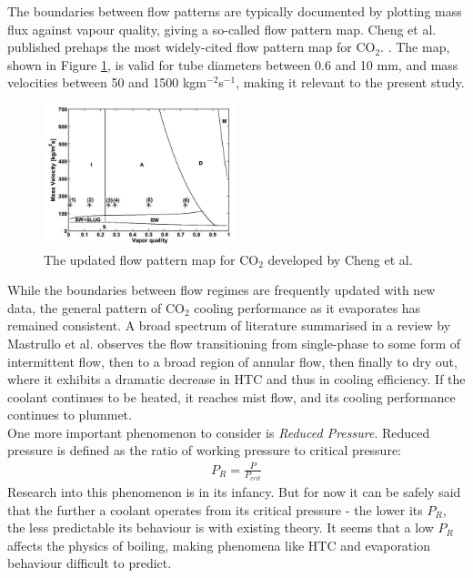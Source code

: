 \documentclass{report}
\begin{document}
The boundaries between flow patterns are typically documented by plotting mass flux against vapour quality, giving a so-called flow pattern map. Cheng et al. published prehaps the most widely-cited flow pattern map for CO$_2$. \cite{Cheng 2008}. The map, shown in Figure \ref{fig:chengMap}, is valid for tube diameters between 0.6 and 10 mm, and mass velocities between 50 and 1500 kgm$^{-2}$s$^{-1}$, making it relevant to the present study.\\
\begin{figure}
\includegraphics[width=0.5\textwidth]{chengMap}
\caption{The updated flow pattern map for CO$_2$ developed by Cheng et al. \cite{Cheng 2008}}
\label{fig:chengMap}
\end{figure}
While the boundaries between flow regimes are frequently updated with new data, the general pattern of CO$_2$ cooling performance as it evaporates has remained consistent. A broad spectrum of literature summarised in a review by Mastrullo et al. \cite{Mastrullo 2010} observes the flow transitioning from single-phase to some form of intermittent flow, then to a broad region of annular flow, then finally to dry out, where it exhibits a dramatic decrease in HTC and thus in cooling efficiency. If the coolant continues to be heated, it reaches mist flow, and its cooling performance continues to plummet. 
\\
One more important phenomenon to consider is \textit{Reduced Pressure}. Reduced pressure is defined as the ratio of working pressure to critical pressure:
\begin{eqnarray}
P_R=\frac{P}{P_{crit}}
\end{eqnarray}
Research into this phenomenon is in its infancy. But for now it can be safely said that the further a coolant operates from its critical pressure - the lower its $P_R$, the less predictable its behaviour is with existing theory. \cite{Mastrullo 2012}\cite{Mastrullo 2012b} It seems that a low $P_R$ affects the physics of boiling, making phenomena like HTC and evaporation behaviour difficult to predict.
\FloatBarrier
\end{document}
